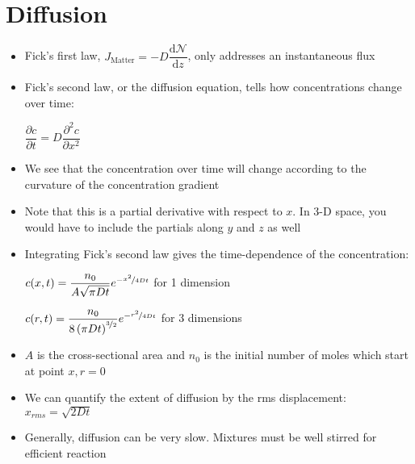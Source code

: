 \documentclass[12pt, openany, letterpaper]{memoir}
\begin{document}
\section{Diffusion}
\begin{itemize}
	\item Fick's first law, $J_{\mathrm{Matter}}=-D\dfrac{\mathrm{d}\mathcal{N}}{\mathrm{d}z}$, only addresses an instantaneous flux
	\item Fick's second law, or the diffusion equation, tells how concentrations change over time:
	
	$\dfrac{\partial c}{\partial t} = D\dfrac{\partial^2 c}{\partial x^2}$
	\item We see that the concentration over time will change according to the curvature of the concentration gradient
	\item Note that this is a partial derivative with respect to $x$. In 3-D space, you would have to include the partials along $y$ and $z$ as well
	\item Integrating Fick's second law gives the time-dependence of the concentration:
	
	$c(x,t)=\dfrac{n_0}{A\sqrt{\pi Dt}}e^{-\nicefrac{x^2}{4Dt}}$ \hspace{2em} for 1 dimension
		
	$c(r,t)=\dfrac{n_0}{8\left(\pi Dt\right)^{\nicefrac{3}{2}}}e^{-\nicefrac{r^2}{4Dt}}$ \hspace{2em} for 3 dimensions
	\item $A$ is the cross-sectional area and $n_0$ is the initial number of moles which start at point $x,r=0$
	\item We can quantify the extent of diffusion by the rms displacement: $x_{rms} = \sqrt{2Dt}$
	\item Generally, diffusion can be very slow. Mixtures must be well stirred for efficient reaction
\end{itemize}
\end{document}
